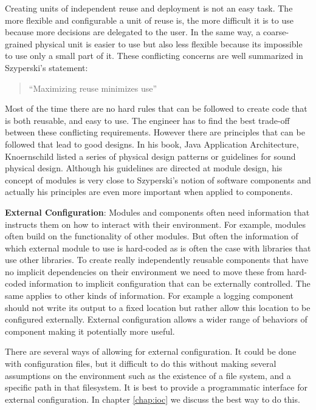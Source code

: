 Creating units of independent reuse and deployment is not an easy task. The more flexible and
configurable a unit of reuse is, the more difficult it is to use because more decisions are
delegated to the user. In the same way, a coarse-grained physical unit is easier to use
but also less flexible because its impossible to  use only a small part of it. These 
conflicting concerns are well summarized in Szyperski's statement:

\begin{quotation}
``Maximizing reuse minimizes use'' 
\end{quotation}

Most of the time there are no hard rules that can be followed to create code that is both reusable,
and easy to use. The engineer has to find the best trade-off between these conflicting requirements.
However there are principles that can be followed that lead to good designs.
In his book, Java Application Architecture, Knoernschild listed a series of physical
design patterns or guidelines for sound physical design. Although his guidelines are directed
at module design, his concept of modules is very close to Szyperski's notion of software components
and actually his principles are even more important when applied to components.

\textbf{External Configuration}:
Modules and components often need information that instructs them
on how to interact with their environment. For example, modules often build on the functionality
of other modules. But often the information of which external module to use is hard-coded as
is often the case with libraries that use other libraries. To create really independently reusable
components that have no implicit dependencies on their environment we need to move these
from hard-coded information to implicit configuration that can be externally controlled.
The same applies to other kinds of information. For example a logging component should not
write its output to a fixed location but rather allow this location to be configured externally.
External configuration allows a wider range of behaviors of component making it potentially
more useful.

There are several ways of allowing for external configuration. It could be done with configuration
files, but it difficult to do this without making several assumptions on the environment such as
the existence of a file system, and a specific path in that filesystem. It is best to provide a
programmatic interface for external configuration. In chapter \ref{chap:ioc} we discuss the best
way to do this.

